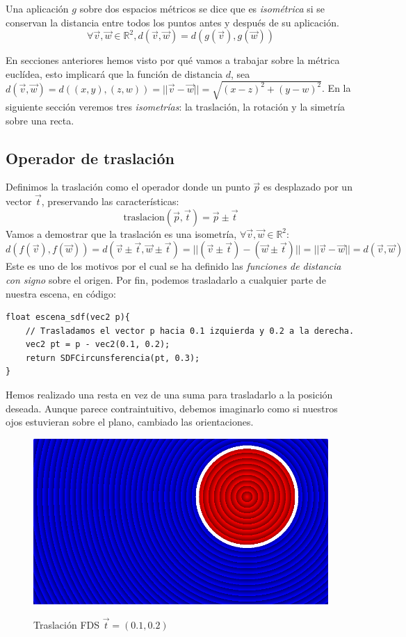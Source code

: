 \begin{definition}
Una aplicación \(g\) sobre dos espacios métricos se dice que es \textit{isométrica} si se conservan la distancia entre todos los puntos antes y después de su aplicación. \[\forall \Vec{v},\Vec{w} \in\mathbb{R}^2, d(\Vec{v},\Vec{w})=d(g(\Vec{v}),g(\Vec{w}))\]
\end{definition}

En secciones anteriores hemos visto por qué vamos a trabajar sobre la métrica euclídea, esto implicará que la función de distancia \(d\), sea  \(d(\Vec{v},\Vec{w})=d((x,y),(z,w))=\vert\vert \Vec{v}-\Vec{w}\vert\vert=\sqrt{(x-z)^2+(y-w)^2}\). En la siguiente sección veremos tres \textit{isometrías}: la traslación, la rotación y la simetría sobre una recta.

\subsection{Operador de traslación}
Definimos la traslación como el operador donde un punto \(\Vec{p}\) es desplazado por un vector \(\Vec{t}\), preservando las características:
\[\text{traslacion}(\Vec{p},\Vec{t})=\Vec{p}\pm\Vec{t}\]
Vamos a demostrar que la traslación es una isometría, \(\forall \Vec{v},\Vec{w}\in\mathbb{R}^2\):
\[d(f(\Vec{v}), f(\Vec{w}))=d(\Vec{v}\pm\Vec{t}, \Vec{w}\pm\Vec{t})=\vert\vert (\Vec{v}\pm\Vec{t})-(\Vec{w}\pm\Vec{t})\vert\vert=\vert\vert \Vec{v}-\Vec{w}\vert\vert=d(\Vec{v}, \Vec{w})\]
Este es uno de los motivos por el cual se ha definido las \textit{funciones de distancia con signo} sobre el origen. Por fin, podemos trasladarlo a cualquier parte de nuestra escena, en código:
\begin{lstlisting}
float escena_sdf(vec2 p){
    // Trasladamos el vector p hacia 0.1 izquierda y 0.2 a la derecha.
    vec2 pt = p - vec2(0.1, 0.2);
    return SDFCircunsferencia(pt, 0.3);
}
\end{lstlisting}

Hemos realizado una resta en vez de una suma para trasladarlo a la posición deseada. Aunque parece contraintuitivo, debemos imaginarlo como si nuestros ojos estuvieran sobre el plano, cambiado las orientaciones.

\begin{figure}[H]
  \centering
  \captionsetup{justification=centering}%
  \includegraphics[width=1.0\textwidth]{secciones/imagenes/sdf/2d/sdf_traslacion.png}\label{fig:traslacion}
  \caption{Traslación FDS \(\Vec{t}=(0.1, 0.2)\)}
\end{figure}

